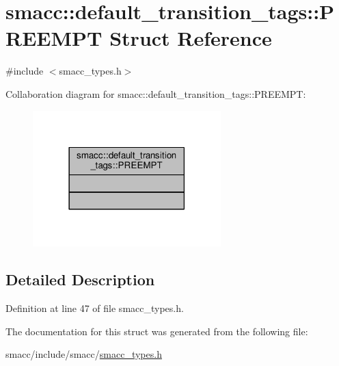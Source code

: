 \hypertarget{structsmacc_1_1default__transition__tags_1_1PREEMPT}{}\section{smacc\+:\+:default\+\_\+transition\+\_\+tags\+:\+:P\+R\+E\+E\+M\+PT Struct Reference}
\label{structsmacc_1_1default__transition__tags_1_1PREEMPT}


{\ttfamily \#include $<$smacc\+\_\+types.\+h$>$}



Collaboration diagram for smacc\+:\+:default\+\_\+transition\+\_\+tags\+:\+:P\+R\+E\+E\+M\+PT\+:\nopagebreak
\begin{figure}[H]
\begin{center}
\leavevmode
\includegraphics[width=206pt]{structsmacc_1_1default__transition__tags_1_1PREEMPT__coll__graph}
\end{center}
\end{figure}


\subsection{Detailed Description}


Definition at line 47 of file smacc\+\_\+types.\+h.



The documentation for this struct was generated from the following file\+:\begin{DoxyCompactItemize}
\item 
smacc/include/smacc/\hyperlink{smacc__types_8h}{smacc\+\_\+types.\+h}\end{DoxyCompactItemize}
